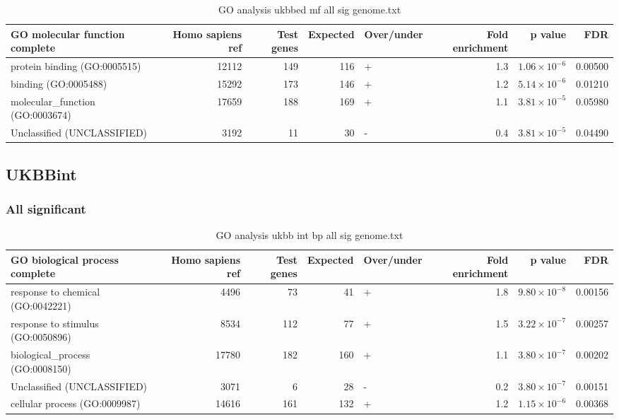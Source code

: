 \begin{table}[ht]
\centering
\begin{adjustbox}{width=\textwidth}
\begin{tabular}{lrrrlrrr}
  \hline
GO molecular function complete & Homo sapiens ref & Test genes & Expected & Over/under & Fold enrichment & p value & FDR \\ 
  \hline
protein binding (GO:0005515) & 12112 & 149 & 116 & + & 1.3 & $1.06 \times 10^{-6}$ & 0.00500 \\ 
  binding (GO:0005488) & 15292 & 173 & 146 & + & 1.2 & $5.14 \times 10^{-6}$ & 0.01210 \\ 
  molecular\_function (GO:0003674) & 17659 & 188 & 169 & + & 1.1 & $3.81 \times 10^{-5}$ & 0.05980 \\ 
  Unclassified (UNCLASSIFIED) & 3192 & 11 & 30 & - & 0.4 & $3.81 \times 10^{-5}$ & 0.04490 \\ 
   \hline
\end{tabular}
\end{adjustbox}
\caption{GO analysis ukbbed mf all sig genome.txt} 
\label{tab:GO analysis ukbbed mf all sig genome.txt}
\end{table}

\subsection{UKBBint}
\subsubsection{All significant}


 	
 	
\begin{table}[ht]
\centering
\begin{adjustbox}{width=\textwidth}
\begin{tabular}{lrrrlrrr}
  \hline
GO biological process complete & Homo sapiens ref & Test genes & Expected & Over/under & Fold enrichment & p value & FDR \\ 
  \hline
response to chemical (GO:0042221) & 4496 & 73 & 41 & + & 1.8 & $9.80 \times 10^{-8}$ & 0.00156 \\ 
  response to stimulus (GO:0050896) & 8534 & 112 & 77 & + & 1.5 & $3.22 \times 10^{-7}$ & 0.00257 \\ 
  biological\_process (GO:0008150) & 17780 & 182 & 160 & + & 1.1 & $3.80 \times 10^{-7}$ & 0.00202 \\ 
  Unclassified (UNCLASSIFIED) & 3071 & 6 & 28 & - & 0.2 & $3.80 \times 10^{-7}$ & 0.00151 \\ 
  cellular process (GO:0009987) & 14616 & 161 & 132 & + & 1.2 & $1.15 \times 10^{-6}$ & 0.00368 \\ 
   \hline
\end{tabular}
\end{adjustbox}
\caption{GO analysis ukbb int bp all sig genome.txt} 
\label{tab:GO analysis ukbb_int_bp_all_sig_genome.txt}
\end{table}




